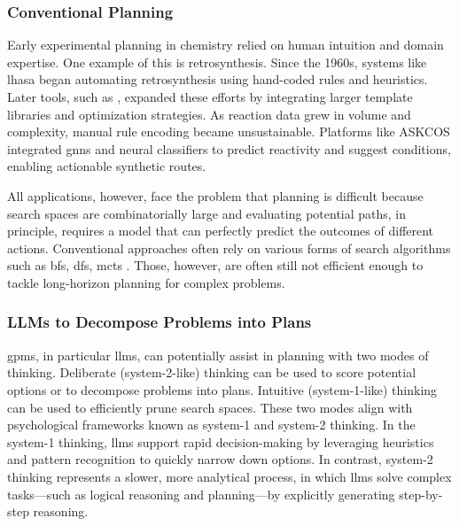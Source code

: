 \subsubsection{Conventional Planning} 
Early experimental planning in chemistry relied on human intuition and domain expertise. 
One example of this is retrosynthesis. 
Since the 1960s, systems like \gls{lhasa} \autocite{corey1972computer} began automating retrosynthesis using hand-coded rules and heuristics\autocite{warr2014short}. 
Later tools, such as \autocite{grzybowski2018chematica}, expanded these efforts by integrating larger template libraries and optimization strategies. 
As reaction data grew in volume and complexity, manual rule encoding became unsustainable. 
Platforms like ASKCOS\autocite{tu2025askcos} integrated \glspl{gnn} and neural classifiers to predict reactivity and suggest conditions, enabling actionable synthetic routes. 

All applications, however, face the problem that planning is difficult because search spaces are combinatorially large and evaluating potential paths, in principle, requires a model that can perfectly predict the outcomes of different actions. Conventional approaches often rely on various forms of search algorithms such as \gls{bfs}, \gls{dfs}, \gls{mcts} \autocite{segler2017towards}. 
Those, however, are often still not efficient enough to tackle long-horizon planning for complex problems. 

\subsubsection{LLMs to Decompose Problems into Plans}
\glspl{gpm}, in particular \glspl{llm}, can potentially assist in planning with two modes of thinking. 
Deliberate (system-2-like) thinking can be used to score potential options or to decompose problems into plans. 
Intuitive (system-1-like) thinking can be used to efficiently prune search spaces. 
These two modes align with psychological frameworks known as system-1 and system-2 thinking. \autocite{kahneman2011thinking}
In the system-1 thinking, \glspl{llm} support rapid decision-making by leveraging heuristics and pattern recognition to quickly narrow down options. 
In contrast, system-2 thinking represents a slower, more analytical process, in which \glspl{llm} solve complex tasks---such as logical reasoning and planning---by explicitly generating step-by-step reasoning. \autocite{ji2025test}

